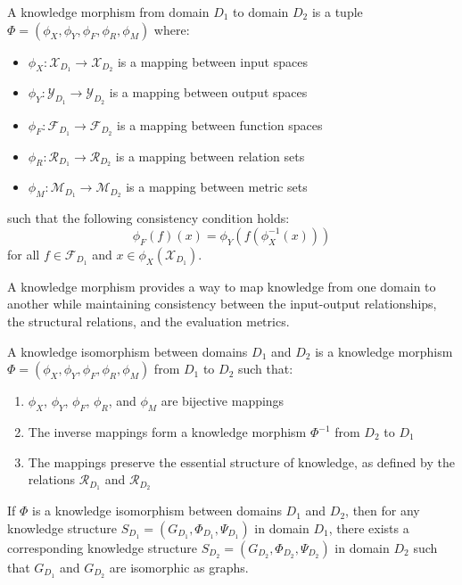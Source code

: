 \begin{definition}
A knowledge morphism from domain $D_1$ to domain $D_2$ is a tuple $\Phi = (\phi_X, \phi_Y, \phi_F, \phi_R, \phi_M)$ where:
\begin{itemize}
    \item $\phi_X: \mathcal{X}_{D_1} \to \mathcal{X}_{D_2}$ is a mapping between input spaces
    \item $\phi_Y: \mathcal{Y}_{D_1} \to \mathcal{Y}_{D_2}$ is a mapping between output spaces
    \item $\phi_F: \mathcal{F}_{D_1} \to \mathcal{F}_{D_2}$ is a mapping between function spaces
    \item $\phi_R: \mathcal{R}_{D_1} \to \mathcal{R}_{D_2}$ is a mapping between relation sets
    \item $\phi_M: \mathcal{M}_{D_1} \to \mathcal{M}_{D_2}$ is a mapping between metric sets
\end{itemize}
such that the following consistency condition holds:
\begin{equation}
\phi_F(f)(x) = \phi_Y(f(\phi_X^{-1}(x)))
\end{equation}
for all $f \in \mathcal{F}_{D_1}$ and $x \in \phi_X(\mathcal{X}_{D_1})$.
\end{definition}

A knowledge morphism provides a way to map knowledge from one domain to another while maintaining consistency between the input-output relationships, the structural relations, and the evaluation metrics.

\begin{definition}
A knowledge isomorphism between domains $D_1$ and $D_2$ is a knowledge morphism $\Phi = (\phi_X, \phi_Y, \phi_F, \phi_R, \phi_M)$ from $D_1$ to $D_2$ such that:
\begin{enumerate}
    \item $\phi_X$, $\phi_Y$, $\phi_F$, $\phi_R$, and $\phi_M$ are bijective mappings
    \item The inverse mappings form a knowledge morphism $\Phi^{-1}$ from $D_2$ to $D_1$
    \item The mappings preserve the essential structure of knowledge, as defined by the relations $\mathcal{R}_{D_1}$ and $\mathcal{R}_{D_2}$
\end{enumerate}
\end{definition}

\begin{theorem}
If $\Phi$ is a knowledge isomorphism between domains $D_1$ and $D_2$, then for any knowledge structure $S_{D_1} = (G_{D_1}, \Phi_{D_1}, \Psi_{D_1})$ in domain $D_1$, there exists a corresponding knowledge structure $S_{D_2} = (G_{D_2}, \Phi_{D_2}, \Psi_{D_2})$ in domain $D_2$ such that $G_{D_1}$ and $G_{D_2}$ are isomorphic as graphs.
\end{theorem}

